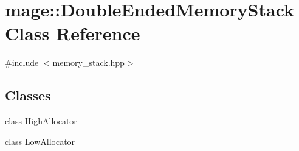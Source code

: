 \hypertarget{classmage_1_1_double_ended_memory_stack}{}\section{mage\+:\+:Double\+Ended\+Memory\+Stack Class Reference}
\label{classmage_1_1_double_ended_memory_stack}


{\ttfamily \#include $<$memory\+\_\+stack.\+hpp$>$}

\subsection*{Classes}
\begin{DoxyCompactItemize}
\item 
class \mbox{\hyperlink{classmage_1_1_double_ended_memory_stack_1_1_high_allocator}{High\+Allocator}}
\item 
class \mbox{\hyperlink{classmage_1_1_double_ended_memory_stack_1_1_low_allocator}{Low\+Allocator}}
\end{DoxyCompactItemize}
